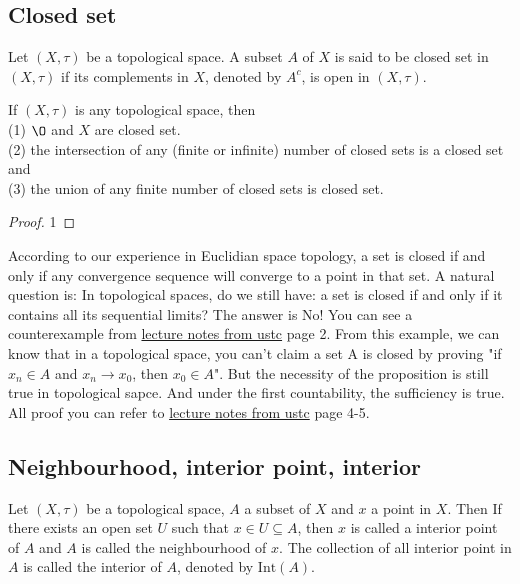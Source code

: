 \subsection{Closed set}
\begin{definition}{}{}
    Let $(X,\tau)$ be a topological space. 
    A subset $A$ of $X$ is said to be closed set in $(X,\tau)$ if its complements in $X$, denoted by $A^c$, is open in $(X,\tau)$.
\end{definition}

\begin{proposition}{}{}
    If $(X,\tau)$ is any topological space, then\\
    (1) $\O$ and $X$ are closed set.\\
    (2) the intersection of any (finite or infinite) number of closed sets is a closed set and\\
    (3) the union of any finite number of closed sets is closed set.
\end{proposition}

\begin{proof}
    1
\end{proof}

According to our experience in Euclidian space topology, a set is closed if and
only if any convergence sequence will converge to a point in that set.
A natural question is:
In topological spaces, do we still have: a set is closed if and only if it
contains all its sequential limits? The answer is No! 
You can see a counterexample from \href{http://staff.ustc.edu.cn/~wangzuoq/Courses/21S-Topology/Notes/Lec07.pdf}{lecture notes from ustc} page 2. 
From this example, we can know that in a topological space, you can't claim a set A is
closed by proving "if $x_n \in A$ and $x_n \rightarrow x_0$, then $x_0 \in A$". 
But the necessity of the proposition is still true in topological sapce. And under the first countability, the sufficiency is true.
All proof you can refer to \href{http://staff.ustc.edu.cn/~wangzuoq/Courses/21S-Topology/Notes/Lec07.pdf}{lecture notes from ustc} page 4-5.



\subsection{Neighbourhood, interior point, interior}
\begin{definition}{}{}
    Let $(X,\tau)$ be a topological space, $A$ a subset of $X$ and $x$ a point in $X$. Then
    If there exists an open set $U$ such that $x\in U\subseteq A$, then $x$ is called a interior point of $A$ and
    $A$ is called the neighbourhood of $x$. The collection of all interior point in $A$ is called the interior of $A$, denoted by $\text{Int}(A)$.
\end{definition}

